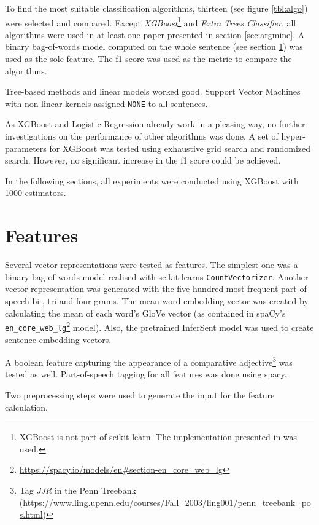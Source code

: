 To find the most suitable classification algorithms, thirteen (see figure \ref{tbl:algo}) were selected and compared. Except \emph{XGBoost}\footnote{XGBoost is not part of scikit-learn. The implementation presented in \cite{DBLP:journals/corr/ChenG16} was used.} and \emph{Extra Trees Classifier}, all algorithms were used in at least one paper presented in section \ref{sec:argmine}. A binary bag-of-words model computed on the whole sentence (see section \ref{sec:features}) was used as the sole feature. The f1 score was used as the metric to compare the algorithms. 

Tree-based methods and linear models worked good. Support Vector Machines with non-linear kernels assigned \texttt{NONE} to all sentences.

As XGBoost and Logistic Regression already work in a pleasing way, no further investigations on the performance of other algorithms was done. A set of hyper-parameters for XGBoost was tested using exhaustive grid search and randomized search. However, no significant increase in the f1 score could be achieved.

In the following sections, all experiments were conducted using XGBoost with 1000 estimators.


\section{Features}
\label{sec:features}
Several vector representations were tested as features. The simplest one was a binary bag-of-words model realised with scikit-learns \texttt{CountVectorizer}. Another vector representation was generated with the five-hundred most frequent part-of-speech bi-, tri and four-grams. The mean word embedding vector was created by calculating the mean of each word's GloVe vector (as contained in spaCy's \texttt{en\_core\_web\_lg}\footnote{\url{https://spacy.io/models/en\#section-en\_core\_web\_lg}} model). Also, the pretrained InferSent model was used to create sentence embedding vectors.

A boolean feature capturing the appearance of a comparative adjective\footnote{Tag \emph{JJR} in the Penn Treebank (\url{https://www.ling.upenn.edu/courses/Fall\_2003/ling001/penn\_treebank\_pos.html})} was tested as well. Part-of-speech tagging for all features was done using spacy.\newline

Two preprocessing steps were used to generate the input for the feature calculation.

